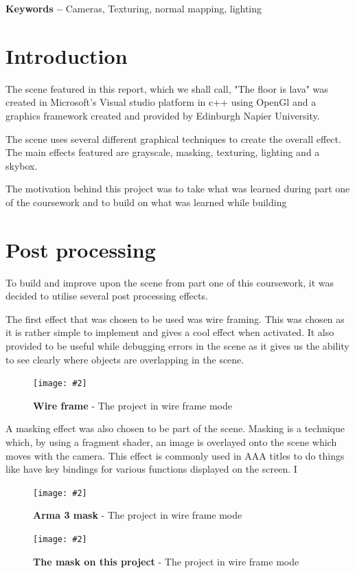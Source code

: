\documentclass[10pt, a4paper]{article}
\title{\mytitle}
\author{\myauthor\hspace{1em}\\\contact\\Edinburgh Napier University\hspace{0.5em}-\hspace{0.5em}\mymodule}
\date{}
\newcommand{\figuremacro}[5]{
    \begin{figure}[#1]
        \centering
        \texttt{[image: \#2]}
        \caption[#3]{\textbf{#3}#4}
        \label{fig:#2}
    \end{figure}
}
\begin{document}
	\maketitle
	\begin{abstract}
	This report will outline the creation and implementation
	of a graphics coursework project. The aim of this project
	was to create a "the floor is lava" type scene, essentially
	a living room which has a floor made of lava.
	
	\end{abstract}
    
	\textbf{Keywords -- }{Cameras, Texturing, normal mapping, lighting}
	\section{Introduction}
	The scene featured in this report, which we shall call, "The floor is lava" was created in Microsoft's Visual studio platform in c++ using OpenGl and a graphics framework created and provided by Edinburgh Napier University. 
	
	The scene uses several different graphical techniques to create the overall effect. The main effects featured are grayscale, masking, texturing, lighting and a skybox.
	
	The motivation behind this project was to take what was learned during part one of the coursework and to build on what was learned while building 
\section{Post processing}

To build and improve upon the scene from part one of this coursework, it was decided to utilise several post processing effects.  

The first effect that was chosen to be used was wire framing. This was chosen as it is rather simple to implement and gives a cool effect when activated. It also provided to be useful while debugging errors in the scene as it gives us the ability to see clearly where objects are overlapping in the scene.

\figuremacro{h}{wireframe.png}{Wire frame}{ - The project in wire frame mode}{0.65}

A masking effect was also chosen to be part of the scene. Masking is a technique which, by using a fragment shader, an image is overlayed onto the scene which moves with the camera. This effect is commonly used in AAA titles to do things like have key bindings for various functions displayed on the screen. I
\figuremacro{h}{armamask.jpg}{Arma 3 mask}{ - The project in wire frame mode}{0.65}
\figuremacro{h}{mask.png}{The mask on this project}{ - The project in wire frame mode}{1.0}
\end{document}
